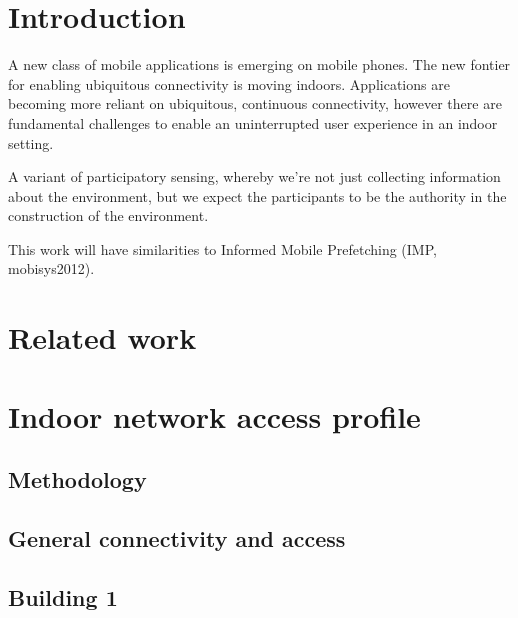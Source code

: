 \section{Introduction}
A new class of mobile applications is emerging on mobile phones.  The new fontier for enabling ubiquitous
connectivity is moving indoors.  Applications are becoming more reliant on ubiquitous, continuous connectivity, 
however there are fundamental challenges to enable an uninterrupted user experience in an indoor setting.

A variant of participatory sensing, whereby we're not just collecting information about the environment, but
we expect the participants to be the authority in the construction of the environment.


This work will have similarities to Informed Mobile Prefetching (IMP, mobisys2012).

\section{Related work}


\section{Indoor network access profile}

\subsection{Methodology}

\subsection{General connectivity and access}

\subsection{Building 1}

